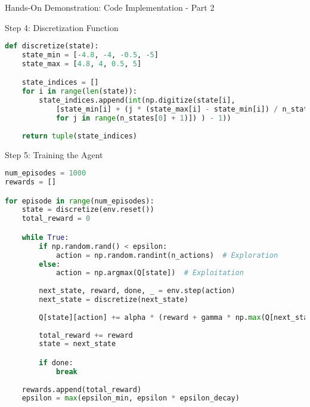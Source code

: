 \documentclass[aspectratio=169]{beamer}
\begin{document}
\begin{frame}[fragile]{Hands-On Demonstration: Code Implementation - Part 2}
    \begin{block}{Step 4: Discretization Function}
        \begin{lstlisting}[language=python]
def discretize(state):
    state_min = [-4.8, -4, -0.5, -5]
    state_max = [4.8, 4, 0.5, 5]

    state_indices = []
    for i in range(len(state)):
        state_indices.append(int(np.digitize(state[i], 
            [state_min[i] + (j * (state_max[i] - state_min[i]) / n_states[0]) 
            for j in range(n_states[0] + 1)]) ) - 1))
    
    return tuple(state_indices)
        \end{lstlisting}
    \end{block}

    \begin{block}{Step 5: Training the Agent}
        \begin{lstlisting}[language=python]
num_episodes = 1000
rewards = []

for episode in range(num_episodes):
    state = discretize(env.reset())
    total_reward = 0

    while True:
        if np.random.rand() < epsilon:
            action = np.random.randint(n_actions)  # Exploration
        else:
            action = np.argmax(Q[state])  # Exploitation
            
        next_state, reward, done, _ = env.step(action)
        next_state = discretize(next_state)
        
        Q[state][action] += alpha * (reward + gamma * np.max(Q[next_state]) - Q[state][action])
        
        total_reward += reward
        state = next_state

        if done:
            break
    
    rewards.append(total_reward)
    epsilon = max(epsilon_min, epsilon * epsilon_decay)
        \end{lstlisting}
    \end{block}
\end{frame}
\end{document}
